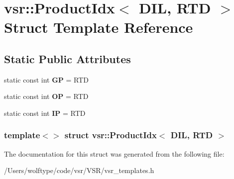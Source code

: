 \hypertarget{structvsr_1_1_product_idx_3_01_d_i_l_00_01_r_t_d_01_4}{\section{vsr\-:\-:Product\-Idx$<$ D\-I\-L, R\-T\-D $>$ Struct Template Reference}
\label{structvsr_1_1_product_idx_3_01_d_i_l_00_01_r_t_d_01_4}
}
\subsection*{Static Public Attributes}
\begin{DoxyCompactItemize}
\item 
\hypertarget{structvsr_1_1_product_idx_3_01_d_i_l_00_01_r_t_d_01_4_a14245023ca6a9684733f0bfc9db8fa20}{static const int {\bfseries G\-P} = R\-T\-D}\label{structvsr_1_1_product_idx_3_01_d_i_l_00_01_r_t_d_01_4_a14245023ca6a9684733f0bfc9db8fa20}

\item 
\hypertarget{structvsr_1_1_product_idx_3_01_d_i_l_00_01_r_t_d_01_4_af44790014a9fd7b9abf6f60678545418}{static const int {\bfseries O\-P} = R\-T\-D}\label{structvsr_1_1_product_idx_3_01_d_i_l_00_01_r_t_d_01_4_af44790014a9fd7b9abf6f60678545418}

\item 
\hypertarget{structvsr_1_1_product_idx_3_01_d_i_l_00_01_r_t_d_01_4_aa7cb1f219997c715be754183935deead}{static const int {\bfseries I\-P} = R\-T\-D}\label{structvsr_1_1_product_idx_3_01_d_i_l_00_01_r_t_d_01_4_aa7cb1f219997c715be754183935deead}

\end{DoxyCompactItemize}
\subsubsection*{template$<$$>$ struct vsr\-::\-Product\-Idx$<$ D\-I\-L, R\-T\-D $>$}



The documentation for this struct was generated from the following file\-:\begin{DoxyCompactItemize}
\item 
/\-Users/wolftype/code/vsr/\-V\-S\-R/vsr\-\_\-templates.\-h\end{DoxyCompactItemize}
